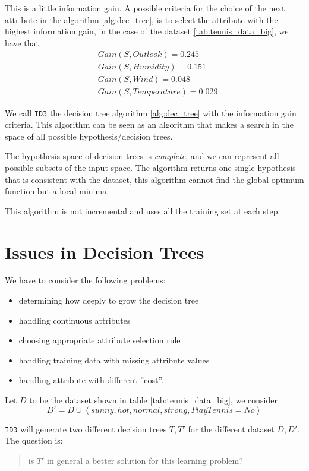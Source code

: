 \documentclass[10pt, letterpaper]{report}
\begin{document}
This is a little information gain. A possible criteria for the choice of the next attribute in the algorithm \ref{alg:dec_tree}, is to select the attribute with the highest information gain, in the case of the dataset \ref{tab:tennis_data_big}, we have that\begin{align}
	 & Gain(S,Outlook)=0.245     \\
	 & Gain(S,Humidity)=0.151    \\
	 & Gain(S,Wind)=0.048        \\
	 & Gain(S,Temperature)=0.029
\end{align}

\noindent We call \texttt{ID3} the decision tree algorithm \ref{alg:dec_tree} with the information gain criteria. This algorithm can be seen as an algorithm that makes a search in the space of all possible hypothesis/decision trees.

The hypothesis space of decision trees is \textit{complete}, and we can represent all possible subsets of the input space. The algorithm returns one single hypothesis that is consistent with the dataset, this algorithm cannot find the global optimum function but a local minima.

This algorithm is not incremental and uses all the training set at each step.
\section{Issues in Decision Trees}
We have to consider the following problems:\begin{itemize}
	\item determining how deeply to grow the decision tree
	\item handling continuous attributes
	\item choosing appropriate attribute selection rule
	\item handling training data with missing attribute values
	\item handling attribute with different ''cost''.
\end{itemize}

\noindent Let $D$ to be the dataset shown in table \ref{tab:tennis_data_big}, we consider \begin{equation}
	D'=D\cup \left\langle  sunny,hot,normal,strong, PlayTennis=No\right\rangle
\end{equation}

\noindent\texttt{ID3} will generate two different decision trees $T,T'$ for the different dataset $D,D'$. The question is:\begin{quote}
	is $T'$ in general a better solution for this learning problem?
\end{quote}
\end{document}
